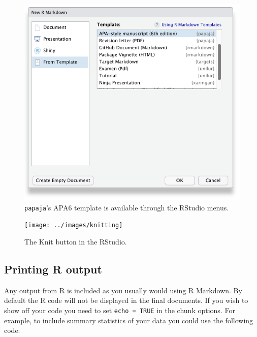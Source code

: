 \documentclass[
  man,floatsintext]{apa6}
\begin{document}
\begin{figure}

{\centering \includegraphics[width=5.69in]{../images/template_selection} 

}

\caption{\texttt{papaja}'s APA6 template is available through the RStudio menus.}\label{fig:menu}
\end{figure}



\begin{figure}

{\centering \texttt{[image: ../images/knitting]} 

}

\caption{The Knit button in the RStudio.}\label{fig:knit}
\end{figure}

\subsection{Printing R output}\label{printing-r-output}

Any output from R is included as you usually would using R Markdown.
By default the R code will not be displayed in the final documents.
If you wish to show off your code you need to set \texttt{echo\ =\ TRUE} in the chunk options.
For example, to include summary statistics of your data you could use the following code:
\end{document}

